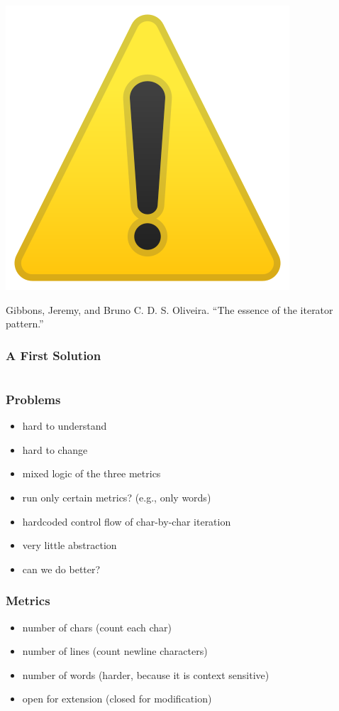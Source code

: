 \documentclass[aspectratio=169]{beamer}
\begin{document}
\begin{frame}
\begin{center}
    \includegraphics{static-images/warning.png}
  \end{center}
  \vfill

  Gibbons, Jeremy, and Bruno C. D. S. Oliveira. ``The essence of the
  iterator pattern.''
\end{frame}

\begin{frame}[fragile]
  \frametitle{A First Solution}
  \inputminted[fontsize=\small]{scala}{snippets/imperative-wc.scala}
\end{frame}

\begin{frame}
  \frametitle{Problems}
  \begin{itemize}
  \item hard to understand
  \item hard to change
  \item mixed logic of the three metrics
  \item run only certain metrics? (e.g., only words)
  \item hardcoded control flow of char-by-char iteration
  \item very little abstraction
  \item can we do better?
  \end{itemize}
\end{frame}

\begin{frame}
  \frametitle{Metrics}
  \begin{itemize}
  \item number of chars (count each char)
  \item number of lines (count newline characters)
  \item number of words (harder, because it is context sensitive)
  \item open for extension (closed for modification)
  \end{itemize}
\end{frame}
\end{document}
